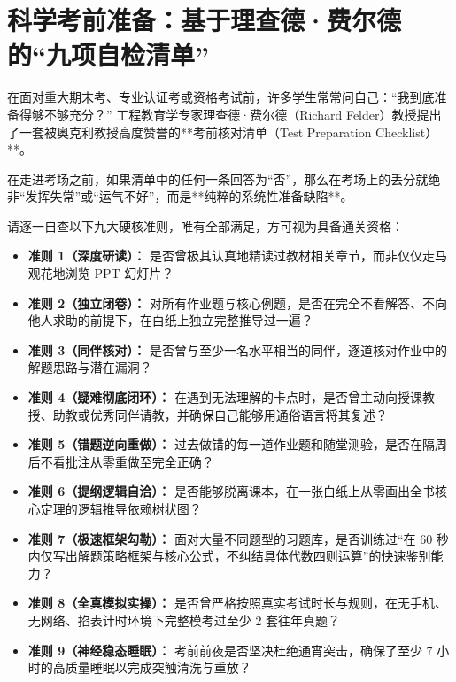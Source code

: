 \documentclass[12pt,a4paper,openany]{ctexbook}
\begin{document}
\section{科学考前准备：基于理查德·费尔德的“九项自检清单”}

在面对重大期末考、专业认证考或资格考试前，许多学生常常问自己：“我到底准备得够不够充分？”
工程教育学专家理查德·费尔德（Richard Felder）教授提出了一套被奥克利教授高度赞誉的**考前核对清单（Test Preparation Checklist）**。

在走进考场之前，如果清单中的任何一条回答为“否”，那么在考场上的丢分就绝非“发挥失常”或“运气不好”，而是**纯粹的系统性准备缺陷**。

\begin{practicebox}
请逐一自查以下九大硬核准则，唯有全部满足，方可视为具备通关资格：
\begin{itemize}
    \item[$\square$] \textbf{准则 1（深度研读）：} 是否曾极其认真地精读过教材相关章节，而非仅仅走马观花地浏览 PPT 幻灯片？
    \item[$\square$] \textbf{准则 2（独立闭卷）：} 对所有作业题与核心例题，是否在完全不看解答、不向他人求助的前提下，在白纸上独立完整推导过一遍？
    \item[$\square$] \textbf{准则 3（同伴核对）：} 是否曾与至少一名水平相当的同伴，逐道核对作业中的解题思路与潜在漏洞？
    \item[$\square$] \textbf{准则 4（疑难彻底闭环）：} 在遇到无法理解的卡点时，是否曾主动向授课教授、助教或优秀同伴请教，并确保自己能够用通俗语言将其复述？
    \item[$\square$] \textbf{准则 5（错题逆向重做）：} 过去做错的每一道作业题和随堂测验，是否在隔周后不看批注从零重做至完全正确？
    \item[$\square$] \textbf{准则 6（提纲逻辑自洽）：} 是否能够脱离课本，在一张白纸上从零画出全书核心定理的逻辑推导依赖树状图？
    \item[$\square$] \textbf{准则 7（极速框架勾勒）：} 面对大量不同题型的习题库，是否训练过“在 60 秒内仅写出解题策略框架与核心公式，不纠结具体代数四则运算”的快速鉴别能力？
    \item[$\square$] \textbf{准则 8（全真模拟实操）：} 是否曾严格按照真实考试时长与规则，在无手机、无网络、掐表计时环境下完整模考过至少 2 套往年真题？
    \item[$\square$] \textbf{准则 9（神经稳态睡眠）：} 考前前夜是否坚决杜绝通宵突击，确保了至少 7 小时的高质量睡眠以完成突触清洗与重放？
\end{itemize}
\end{practicebox}
\end{document}
